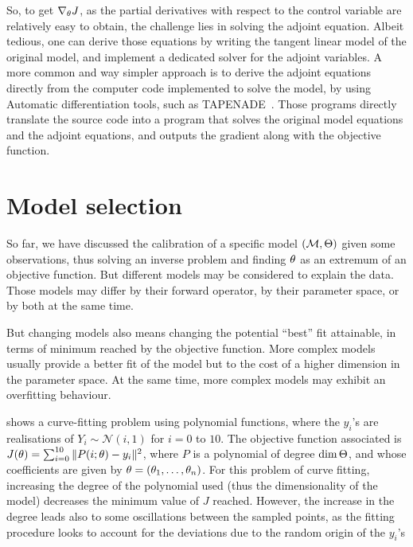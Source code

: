 \documentclass[../../Main_ManuscritThese.tex]{subfiles}
\begin{document}
So, to get $\nabla_\theta J$, as the partial derivatives with respect
to the control variable are relatively easy to obtain, the challenge
lies in solving the adjoint equation. Albeit tedious, one can derive
those equations by writing the tangent linear model of the original
model, and implement a dedicated solver for the adjoint variables. A
more common and way simpler approach is to derive the adjoint
equations directly from the computer code implemented to solve the
model, by using Automatic differentiation tools, such as
\textsc{TAPENADE}~\cite{hascoet_tapenade_2013}. Those programs
directly translate the source code into a program that solves the
original model equations and the adjoint equations, and outputs the
gradient along with the objective function.


\section{Model selection}
\label{sec:model_selection}
So far, we have discussed the calibration of a specific model
$(\mathcal{M}, \Theta)$ given some observations, thus solving an
inverse problem and finding ${\theta}_{\mathrm{}}$ as an extremum of an
objective function. But different models may be considered to explain
the data. Those models may differ by their forward operator, by their
parameter space, or by both at the same time.

But changing models also means changing the potential ``best'' fit attainable, in terms of minimum reached by the objective function.
More complex models usually provide a better fit of the model but to the cost of a higher dimension in the parameter space. At the same time, more complex models may exhibit an overfitting behaviour.

\begin{example}
   shows a curve-fitting problem using
  polynomial functions, where the $y_i$'s are realisations of
  $Y_i \sim \mathcal{N}(i, 1)$ for $i=0$ to $10$. The objective
  function associated is
  $J(\theta) = \sum_{i=0}^{10}\|P(i;\theta) - y_i\|^2$, where $P$ is a
  polynomial of degree $\dim \Theta$, and whose coefficients are
  given by $\theta = (\theta_1,\dots,\theta_n)$.  For this problem of curve
  fitting, increasing the degree of the polynomial used (thus the
  dimensionality of the model) decreases the minimum value of $J$
  reached. However, the increase in the degree leads also to some
  oscillations between the sampled points, as the fitting procedure
  looks to account for the deviations due to the random origin of the
  $y_i$'s
\end{example}
\end{document}
